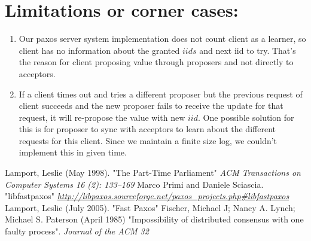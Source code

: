 \section{Limitations or corner cases:}
\begin{enumerate}
\item Our paxos server system implementation does not count client as a learner, so client has no information about the granted $iids$ and next iid to try. That's the reason for client proposing value through proposers and not directly to acceptors.

\item If a client times out and tries a different proposer but the previous request of client succeeds and the new proposer fails to receive the update for that request, it will re-propose the value with new $iid$. One possible solution for this is for proposer to sync with acceptors to learn about the different requests for this client. Since we maintain a finite size log, we couldn't implement this in given time.
\end{enumerate}

\begin{thebibliography}{100} 
 Lamport, Leslie (May 1998). "The Part-Time Parliament" \emph{ ACM Transactions on Computer Systems 16 (2): 133–169}
 Marco Primi and Daniele Sciascia. "libfastpaxos" \emph{\url{http://libpaxos.sourceforge.net/paxos_projects.php\#libfastpaxos}}
 Lamport, Leslie (July 2005). "Fast Paxos" \emph{}
 Fischer, Michael J; Nancy A. Lynch; Michael S. Paterson (April 1985)  "Impossibility of distributed consensus with one faulty process". \emph{Journal of the ACM 32}
\end{thebibliography} 

